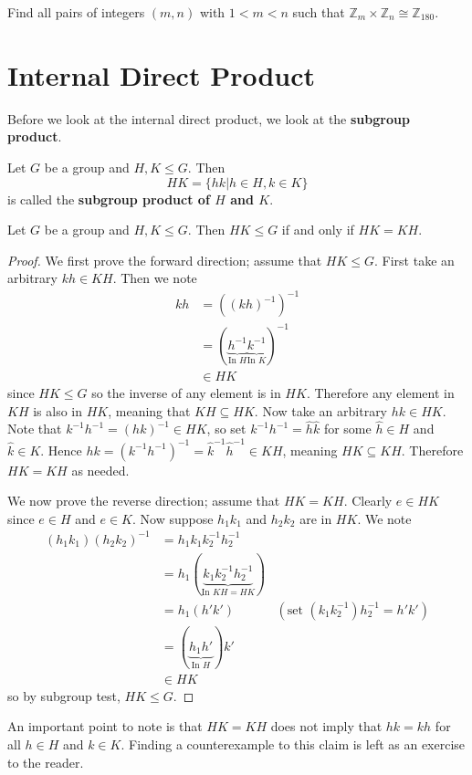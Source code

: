 \begin{exercise}
    Find all pairs of integers $(m, n)$ with $1 < m < n$ such that $\mathbb{Z}_m \times \mathbb{Z}_n \cong \mathbb{Z}_{180}$.
\end{exercise}

\section{Internal Direct Product}
Before we look at the internal direct product, we look at the \textbf{subgroup product}.
\begin{definition}
    Let $G$ be a group and $H, K \leq G$. Then
    \[
        HK = \{hk \vert h \in H, k \in K\}
    \]
    is called the \textbf{subgroup product of $H$ and $K$}.
\end{definition}

\begin{proposition}\label{prop-subgroup-product-is-subgroup}
    Let $G$ be a group and $H, K \leq G$. Then $HK \leq G$ if and only if $HK = KH$.
\end{proposition}

\newpage

\begin{proof}
    We first prove the forward direction; assume that $HK \leq G$. First take an arbitrary $kh \in KH$. Then we note
    \begin{align*}
        kh &= \left(\left(kh\right)^{-1}\right)^{-1}\\
        &= (\underbrace{h^{-1}}_{\text{In } H}\underbrace{k^{-1}}_{\text{In } K})^{-1}\\
        &\in HK
    \end{align*}
    since $HK \leq G$ so the inverse of any element is in $HK$. Therefore any element in $KH$ is also in $HK$, meaning that $KH \subseteq HK$. Now take an arbitrary $hk \in HK$. Note that $k^{-1}h^{-1} = (hk)^{-1} \in HK$, so set $k^{-1}h^{-1} = \hat{h}\hat{k}$ for some $\hat{h} \in H$ and $\hat{k} \in K$. Hence $hk = \left(k^{-1}h^{-1}\right)^{-1} = \hat{k}^{-1}\hat{h}^{-1} \in KH$, meaning $HK \subseteq KH$. Therefore $HK = KH$ as needed.

    We now prove the reverse direction; assume that $HK = KH$. Clearly $e \in HK$ since $e \in H$ and $e \in K$. Now suppose $h_1k_1$ and $h_2k_2$ are in $HK$. We note
    \begin{align*}
        (h_1k_1)(h_2k_2)^{-1} &= h_1k_1k_2^{-1}h_2^{-1}\\
        &= h_1(\underbrace{k_1k_2^{-1}h_2^{-1}}_{\text{In } KH = HK})\\
        &= h_1(h'k') & (\text{set }(k_1k_2^{-1})h_2^{-1} = h'k')\\
        &= (\underbrace{h_1h'}_{\text{In } H})k'\\
        &\in HK
    \end{align*}
    so by subgroup test, $HK \leq G$.
\end{proof}
An important point to note is that $HK = KH$ does not imply that $hk = kh$ for all $h \in H$ and $k \in K$. Finding a counterexample to this claim is left as an exercise to the reader.

